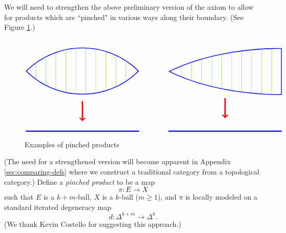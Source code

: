 We will need to strengthen the above preliminary version of the axiom to allow
for products which are ``pinched" in various ways along their boundary.
(See Figure \ref{pinched_prods}.)
\begin{figure}[t]
$$
\begin{tikzpicture}[baseline=0]
\begin{scope}
\path[clip] (0,0) arc (135:45:4) arc (-45:-135:4);
\draw[blue,line width=2pt] (0,0) arc (135:45:4) arc (-45:-135:4);
\foreach \x in {0, 0.5, ..., 6} {
	\draw[green!50!brown] (\x,-2) -- (\x,2);
}
\end{scope}
\draw[blue,line width=1.5pt] (0,-3) -- (5.66,-3);
\draw[->,red,line width=2pt] (2.83,-1.5) -- (2.83,-2.5);
\end{tikzpicture}
\qquad \qquad
\begin{tikzpicture}[baseline=-0.15cm]
\begin{scope}
\path[clip] (0,1) arc (90:135:8 and 4)  arc (-135:-90:8 and 4) -- cycle;
\draw[blue,line width=2pt] (0,1) arc (90:135:8 and 4)  arc (-135:-90:8 and 4) -- cycle;
\foreach \x in {-6, -5.5, ..., 0} {
	\draw[green!50!brown] (\x,-2) -- (\x,2);
}
\end{scope}
\draw[blue,line width=1.5pt] (-5.66,-3.15) -- (0,-3.15);
\draw[->,red,line width=2pt] (-2.83,-1.5) -- (-2.83,-2.5);
\end{tikzpicture}
$$
\caption{Examples of pinched products}\label{pinched_prods}
\end{figure}
(The need for a strengthened version will become apparent in Appendix \ref{sec:comparing-defs}
where we construct a traditional category from a topological category.)
Define a {\it pinched product} to be a map
\[
	\pi: E\to X
\]
such that $E$ is a $k{+}m$-ball, $X$ is a $k$-ball ($m\ge 1$), and $\pi$ is locally modeled
on a standard iterated degeneracy map
\[
	d: \Delta^{k+m}\to\Delta^k .
\]
(We thank Kevin Costello for suggesting this approach.)


